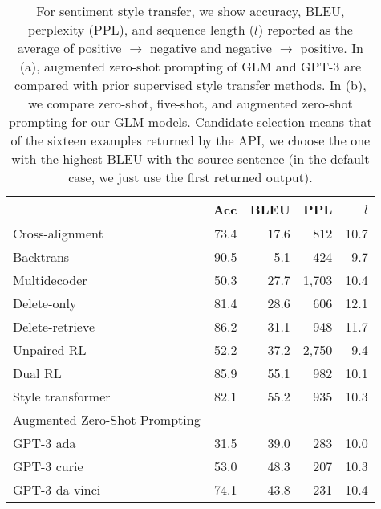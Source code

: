 \begin{table}
\caption{
For sentiment style transfer, we show accuracy, BLEU, perplexity (PPL), and sequence length ($l$) reported as the average of positive $\rightarrow$ negative and negative $\rightarrow$ positive. 
In (a), augmented zero-shot prompting of GLM and GPT-3 are compared with prior supervised style transfer methods.
In (b), we compare zero-shot, five-shot, and augmented zero-shot prompting for our GLM models. 
Candidate selection means that of the sixteen examples returned by the API, we choose the one with the highest BLEU with the source sentence (in the default case, we just use the first returned output).  
}
    \setlength{\tabcolsep}{2pt}
    \begin{subtable}{.58\linewidth}
    \centering \small 
        \begin{tabular}{l r r r r}
        \toprule
         & Acc & BLEU & PPL & $l$\\
        \midrule
        Cross-alignment \citep{NIPS2017_2d2c8394} & 73.4 & 17.6 & 812 & 10.7 \\
        Backtrans \citep{prabhumoye-etal-2018-style} & 90.5 & 5.1 & 424 & 9.7 \\
        Multidecoder \citep{AAAI1817015}  & 50.3 & 27.7 & 1,703 & 10.4 \\
        Delete-only \citep{li-etal-2018-delete} & 81.4 & 28.6 & 606 & 12.1 \\
        Delete-retrieve \citep{li-etal-2018-delete} & 86.2 & 31.1 & 948 & 11.7 \\
        Unpaired RL \citep{xu-etal-2018-unpaired} & 52.2 & 37.2 & 2,750 & 9.4 \\
        Dual RL \citep{DBLP:conf/ijcai/LuoLZYCSS19} & 85.9 & 55.1 & 982 & 10.1 \\
        Style transformer \citep{dai-etal-2019-style} & 82.1 & 55.2 & 935 & 10.3 \\
        \midrule
        \underline{Augmented Zero-Shot Prompting} \\
        GPT-3 ada & 31.5 & 39.0 & 283 & 10.0 \\
        GPT-3 curie  & 53.0 & 48.3 & 207 & 10.3 \\
        GPT-3 da vinci  & 74.1 & 43.8 & 231 & 10.4 \\
        \midrule

\end{tabular}
\end{subtable}
\end{table}

